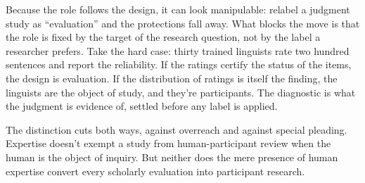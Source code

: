Because the role follows the design, it can look manipulable: relabel a judgment study as \enquote{evaluation} and the protections fall away. What blocks the move is that the role is fixed by the target of the research question, not by the label a researcher prefers. Take the hard case: thirty trained linguists rate two hundred sentences and report the reliability. If the ratings certify the status of the items, the design is evaluation. If the distribution of ratings is itself the finding, the linguists are the object of study, and they're participants. The diagnostic is what the judgment is evidence of, settled before any label is applied.

The distinction cuts both ways, against overreach and against special pleading. Expertise doesn't exempt a study from human-participant review when the human is the object of inquiry. But neither does the mere presence of human expertise convert every scholarly evaluation into participant research.
